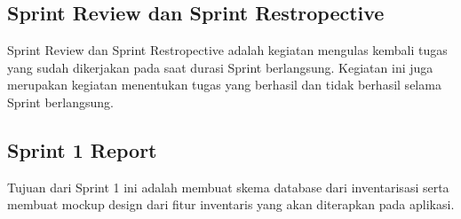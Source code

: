 \subsection{Sprint Review dan Sprint Restropective}

Sprint Review dan Sprint Restropective adalah kegiatan mengulas kembali tugas yang sudah dikerjakan pada saat durasi Sprint berlangsung. Kegiatan ini juga merupakan kegiatan menentukan tugas yang berhasil dan tidak berhasil selama Sprint berlangsung.

\subsection{Sprint 1 Report}

Tujuan dari Sprint 1 ini adalah membuat skema database dari inventarisasi serta membuat mockup design dari fitur inventaris yang akan diterapkan pada aplikasi.


